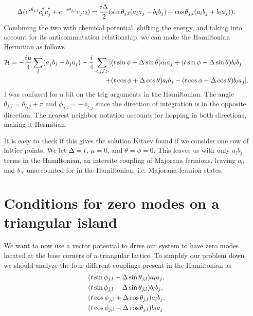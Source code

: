 \begin{equation}
  \Delta ( e^{i\theta_{j,l}} c^{\dagger}_l c^{\dagger}_j + e^{-i\theta_{j,l}} c_j c_l) = \dfrac{i\Delta}{2} ( \sin\theta_{j,l} (a_l a_j - b_l b_j) - \cos\theta_{j,l} (a_l b_j + b_l a_j) ).
\end{equation}
Combining the two with chemical potential, shifting the energy, and taking into account for its anticommutation relationship, we can make the Hamiltonian Hermitian as follows
\begin{align}
  \mathcal{H} = -\dfrac{i\mu}{4} \sum_j (a_j b_j - b_j a_j) - \dfrac{i}{4} \sum_{<j,l>} [&(t\sin\phi-\Delta\sin\theta) a_l a_j + (t\sin\phi+\Delta\sin\theta) b_l b_j \nonumber \\
  +&(t\cos\phi+\Delta\cos\theta) a_l b_j - (t\cos\phi-\Delta\cos\theta) b_l a_j].
\end{align}
I was confused for a bit on the trig arguments in the Hamiltonian.
The angle $\theta_{j,l} = \theta_{l,j}+\pi$ and $\phi_{j,l} = -\phi_{l,j}$ since the direction of integration is in the opposite direction.
The nearest neighbor notation accounts for hopping in both directions, making it Hermitian.

It is easy to check if this gives the solution Kitaev found if we consider one row of lattice points.
We let $\Delta = t$, $\mu=0$, and $\theta = \phi = 0$.
This leaves us with only $a_l b_j$ terms in the Hamiltonian, an intersite coupling of Majorana fermions, leaving $a_0$ and $b_N$ unaccounted for in the Hamiltonian, i.e. Majorana fermion states.

\section{Conditions for zero modes on a triangular island}

\par
We want to now use a vector potential to drive our system to have zero modes located at the base corners of a triangular lattice.
To simplify our problem down we should analyze the four different couplings present in the Hamiltonian as
\begin{align}
  &(t \sin\phi_{j,l} - \Delta \sin\theta_{j,l}) a_l a_j, \\
  &(t \sin\phi_{j,l} + \Delta \sin\theta_{j,l}) b_l b_j, \\
  &(t \cos\phi_{j,l} + \Delta \cos\theta_{j,l}) a_l b_j, \\
  &(t \cos\phi_{j,l} - \Delta \cos\theta_{j,l}) b_l a_j
\end{align}

